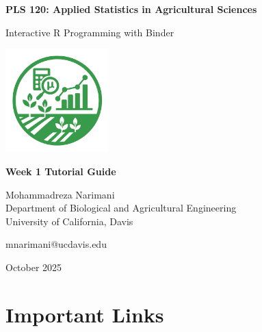 \documentclass[11pt,a4paper]{article}
\begin{document}
\begin{titlepage}
    \centering
    \vspace*{2cm}
    
    {\Huge\bfseries\color{primarygreen} PLS 120: Applied Statistics in Agricultural Sciences}
    
    \vspace{1cm}
    
    {\Large\color{primarygreen} Interactive R Programming with Binder}
    
    \vspace{2cm}
    
    \includegraphics[width=0.3\textwidth]{../../images/logos/Home_Page_Logo.png}
    
    \vspace{2cm}
    
    {\large\bfseries Week 1 Tutorial Guide}
    
    \vspace{1cm}
    
    {\large Mohammadreza Narimani}\\
    {\normalsize Department of Biological and Agricultural Engineering}\\
    {\normalsize University of California, Davis}
    
    \vspace{1cm}
    
    {\normalsize mnarimani@ucdavis.edu}
    
    \vfill
    
    {\normalsize October 2025}
\end{titlepage}

\tableofcontents
\newpage

\section{Important Links}
\end{document}
